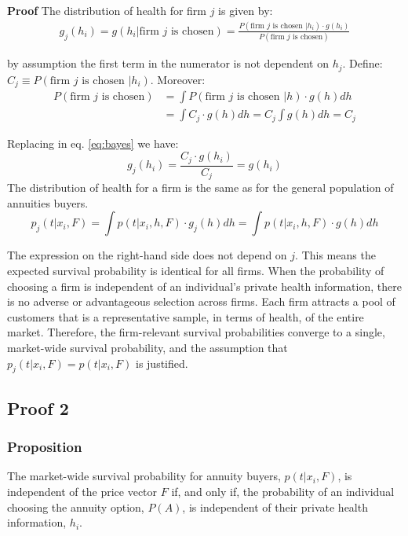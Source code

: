 \documentclass[12pt]{article}
\theoremstyle{plain}
\theoremstyle{plain}
\begin{document}
\textbf{Proof}
The distribution of health for firm $j$ is given by: 
\begin{align}\label{eq:bayes}
        g_j(h_i) = g(h_i | \text{firm } j \text{ is chosen}) = \frac{P(\text{firm } j \text{ is chosen } | h_i) \cdot g(h_i)}{P(\text{firm } j \text{ is chosen})}
\end{align}
 
by assumption the first term in the numerator is not dependent on $h_j$. Define: $C_j\equiv P(\text{firm } j \text{ is chosen } | h_i) $. Moreover: 
 \begin{align*}
    P(\text{firm } j \text{ is chosen}) &= \int P(\text{firm } j \text{ is chosen } | h) \cdot g(h) dh \\
    &= \int C_j \cdot g(h) dh = C_j \int g(h) dh = C_j
\end{align*}

Replacing in eq. \ref{eq:bayes} we have: 
\[
    g_j(h_i) = \frac{C_j \cdot g(h_i)}{C_j} = g(h_i)
\]
The distribution of health for a firm is the same as for the general population of annuities buyers. 
\[
p_j(t|x_i, F) =  \int p(t|x_i, h, F) \cdot g_j(h) dh =    \int p(t|x_i, h, F) \cdot g(h) dh\]

The expression on the right-hand side does not depend on $j$. This means the expected survival probability is identical for all firms.
When the probability of choosing a firm is independent of an individual's private health information, there is no adverse or advantageous selection across firms. Each firm attracts a pool of customers that is a representative sample, in terms of health, of the entire market. Therefore, the firm-relevant survival probabilities converge to a single, market-wide survival probability, and the assumption that $p_j(t|x_i, F) = p(t|x_i, F)$ is justified.

\subsection{Proof 2}\label{sec:proof2}



\subsubsection*{Proposition}
The market-wide survival probability for annuity buyers, $p(t|x_i, F)$, is independent of the price vector $F$ if, and only if, the probability of an individual choosing the annuity option, $P(A)$, is independent of their private health information, $h_i$.
\end{document}
